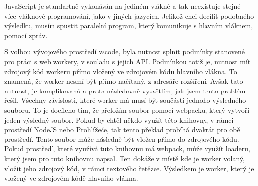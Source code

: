 JavaScript je standartně vykonáván na jediném vlákně a tak neexistuje stejné více vláknové programování, jako v jiných jazycích.
Jelikož chci docílit podobného výsledku, musím spustit paralelní program, 
který komunikuje s hlavním vláknem, pomocí zpráv.

S volbou vývojového prostředí vscode, byla nutnost splnit podmínky stanovené pro práci s web workery, v souladu s jejich API. 
Podmínkou totiž je, nutnost mít zdrojový kód workeru přímo vložený ve zdrojovém kódu hlavního vlákna.
To znamená, že worker nesmí být přímo načítaný, z adresáře rozšíření.
Avšak tato nutnost, je komplikovaná a proto následovně vysvětlím, jak jsem tento problém řešil.
Všechny závislosti, které worker má musí být součástí jednoho výsledného souboru.
To je docíleno tím, že přeložím soubor pomocí webpacku, který vytvoří jeden výsledný soubor.
Pokud by chtěl někdo využít této knihovny, v rámci prostředí NodeJS nebo Prohlížeče, 
tak tento překlad probíhá dvakrát pro obě prostředí.
Tento soubor může následně být vložen přímo do zdrojového kódu.
Pokud prostředí, které využívá tuto knihovnu má webpack, 
může využít loaderu, který jsem pro tuto knihovnu napsal. 
Ten dokáže v místě kde je worker volaný, vložit jeho zdrojový kód, v rámci textového řetězce.
Výsledkem je worker, který je vložený ve zdrojovém kódě hlavního vlákna.


\endinput